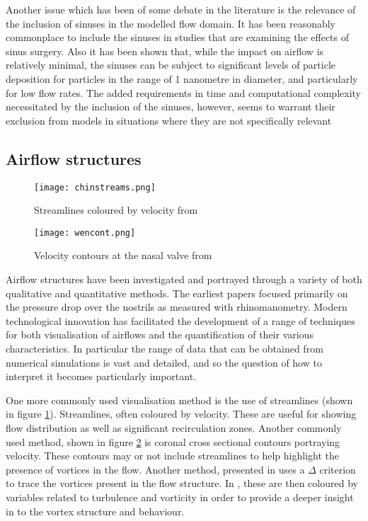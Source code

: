 Another issue which has been of some debate in the literature is the relevance of the inclusion of sinuses in the modelled flow domain. It has been reasonably commonplace to include the sinuses in studies that are examining the effects of sinus surgery\cite{Xiong2008a, Lindemann2005}. Also it has been shown that, while the impact on airflow is relatively minimal, the sinuses can be subject to significant levels of particle deposition for particles in the range of 1 nanometre in diameter, and particularly for low flow rates\cite{Ge2012}. The added requirements in time and computational complexity necessitated by the inclusion of the sinuses, however, seems to warrant their exclusion from models in situations where they are not specifically relevant\cite{Doorly2008c}


\subsection{Airflow structures}

\begin{figure}
  \centering
  \texttt{[image: chinstreams.png]}
  \caption{Streamlines coloured by velocity from \cite{Tan2012}} \label{fig:chinstreams}
\centering
\end{figure}

\begin{figure}
  \centering
  \texttt{[image: wencont.png]}
  \caption{Velocity contours at the nasal valve from \cite{Wen2008}} \label{fig:wencont}
\centering
\end{figure}
Airflow structures have been investigated and portrayed through a variety of both qualitative and quantitative methods. The earliest papers focused primarily on the pressure drop over the nostrils as measured with rhinomanometry\cite{Martin1981}. Modern technological innovation has facilitated the development of a range of techniques for both visualisation of airflows and the quantification of their various characteristics. In particular the range of data that can be obtained from numerical simulations is vast and detailed, and so the question of how to interpret it becomes particularly important.

One more commonly used visualisation method is the use of streamlines (shown in figure \ref{fig:chinstreams}). Streamlines, often coloured by velocity\cite{Wen2008, Zhu2011, Garcia2007}. These are useful for showing flow distribution as well as significant recirculation zones\cite{Lintermann2013, Xi2014}. Another commonly used method, shown in figure \ref{fig:wencont} is coronal cross sectional contours portraying velocity. These contours may or not include streamlines to help highlight the presence of vortices in the flow\cite{Wen2008}. Another method, presented in \cite{Lintermann2013} uses a $\Delta$ criterion to trace the vortices present in the flow structure. In \cite{Lintermann2013}, these are then coloured by variables related to turbulence and vorticity in order to provide a deeper insight in to the vortex structure and behaviour.

